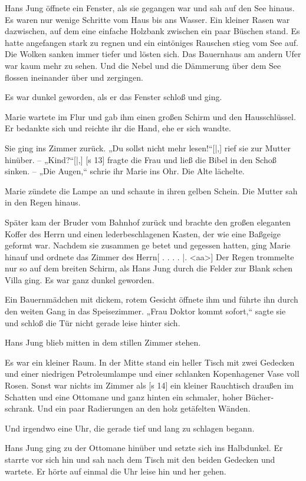 Hans Jung öffnete ein Fenster, als sie gegangen
war und sah auf den See hinaus. Es waren nur
wenige Schritte vom Haus bis ans Wasser. Ein
kleiner Rasen war dazwischen, auf dem eine einfache
Holzbank zwischen ein paar Büschen stand. Es hatte
angefangen stark zu regnen und ein eintöniges Rauschen
stieg vom See auf. Die Wolken sanken immer tiefer
und lösten sich. Das Bauernhaus am andern Ufer
war kaum mehr zu sehen. Und die Nebel und die
Dämmerung über dem See flossen ineinander über
und zergingen.

Es war dunkel geworden, als er das Fenster
schloß und ging.

Marie wartete im Flur und gab ihm einen großen
Schirm und den Hausschlüssel. Er bedankte sich und
reichte ihr die Hand, ehe er sich wandte.

Sie ging ins Zimmer zurück. „Du sollst nicht
mehr lesen!“[|,] rief sie zur Mutter hinüber. – „Kind?“[|,]
[s 13]
fragte die Frau und ließ die Bibel in den Schoß
sinken. – „Die Augen,“ schrie ihr Marie ins Ohr.
Die Alte lächelte.

Marie zündete die Lampe an und schaute in
ihren gelben Schein. Die Mutter sah in den Regen
hinaus.

Später kam der Bruder vom Bahnhof zurück
und brachte den großen eleganten Koffer des Herrn
und einen lederbeschlagenen Kasten, der wie eine
Baßgeige geformt war. Nachdem sie zusammen ge­
betet und gegessen hatten, ging Marie hinauf und
ordnete das Zimmer des Herrn[ . . . .
|.
<aa>]
Der Regen trommelte nur so auf dem breiten
Schirm, als Hans Jung durch die Felder zur Blank­
schen Villa ging. Es war ganz dunkel geworden.

Ein Bauernmädchen mit dickem, rotem Gesicht
öffnete ihm und führte ihn durch den weiten Gang
in das Speisezimmer. „Frau Doktor kommt sofort,“
sagte sie und schloß die Tür nicht gerade leise
hinter sich.

Hans Jung blieb mitten in dem stillen Zimmer
stehen.

Es war ein kleiner Raum. In der Mitte stand
ein heller Tisch mit zwei Gedecken und einer niedrigen
Petroleumlampe und einer schlanken Kopenhagener
Vase voll Rosen. Sonst war nichts im Zimmer als
[s 14]
ein kleiner Rauchtisch draußen im Schatten und eine
Ottomane und ganz hinten ein schmaler, hoher Bücher­
schrank. Und ein paar Radierungen an den holz­
getäfelten Wänden.

Und irgendwo eine Uhr, die gerade tief und
lang zu schlagen begann.

Hans Jung ging zu der Ottomane hinüber und
setzte sich ins Halbdunkel. Er starrte vor sich hin
und sah nach dem Tisch mit den beiden Gedecken
und wartete. Er hörte auf einmal die Uhr leise
hin und her gehen.

